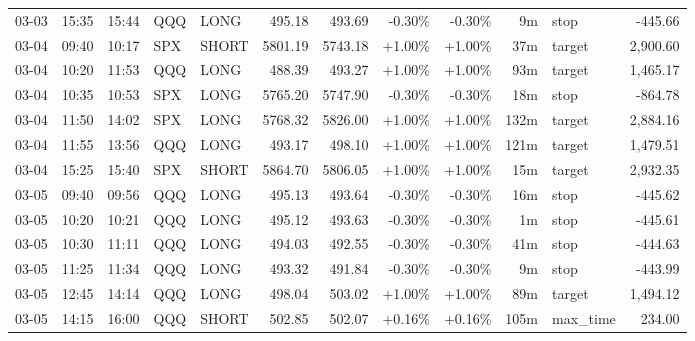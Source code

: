 \documentclass[11pt,a4paper]{article}
\begin{document}
\begin{center}
\begin{longtable}{>{\color{txtmain}}l l l l l r r r r r >{\color{txtmain}}l r}
03-03 & 15:35 & 15:44 & QQQ & LONG & 495.18 & 493.69 & \textcolor{lossred}{-0.30\%} & \textcolor{lossred}{-0.30\%} & 9m & stop & \textcolor{lossred}{-445.66} \\
03-04 & 09:40 & 10:17 & SPX & SHORT & 5801.19 & 5743.18 & \textcolor{wingreen}{+1.00\%} & \textcolor{wingreen}{+1.00\%} & 37m & target & \textcolor{wingreen}{2,900.60} \\
03-04 & 10:20 & 11:53 & QQQ & LONG & 488.39 & 493.27 & \textcolor{wingreen}{+1.00\%} & \textcolor{wingreen}{+1.00\%} & 93m & target & \textcolor{wingreen}{1,465.17} \\
03-04 & 10:35 & 10:53 & SPX & LONG & 5765.20 & 5747.90 & \textcolor{lossred}{-0.30\%} & \textcolor{lossred}{-0.30\%} & 18m & stop & \textcolor{lossred}{-864.78} \\
03-04 & 11:50 & 14:02 & SPX & LONG & 5768.32 & 5826.00 & \textcolor{wingreen}{+1.00\%} & \textcolor{wingreen}{+1.00\%} & 132m & target & \textcolor{wingreen}{2,884.16} \\
03-04 & 11:55 & 13:56 & QQQ & LONG & 493.17 & 498.10 & \textcolor{wingreen}{+1.00\%} & \textcolor{wingreen}{+1.00\%} & 121m & target & \textcolor{wingreen}{1,479.51} \\
03-04 & 15:25 & 15:40 & SPX & SHORT & 5864.70 & 5806.05 & \textcolor{wingreen}{+1.00\%} & \textcolor{wingreen}{+1.00\%} & 15m & target & \textcolor{wingreen}{2,932.35} \\
03-05 & 09:40 & 09:56 & QQQ & LONG & 495.13 & 493.64 & \textcolor{lossred}{-0.30\%} & \textcolor{lossred}{-0.30\%} & 16m & stop & \textcolor{lossred}{-445.62} \\
03-05 & 10:20 & 10:21 & QQQ & LONG & 495.12 & 493.63 & \textcolor{lossred}{-0.30\%} & \textcolor{lossred}{-0.30\%} & 1m & stop & \textcolor{lossred}{-445.61} \\
03-05 & 10:30 & 11:11 & QQQ & LONG & 494.03 & 492.55 & \textcolor{lossred}{-0.30\%} & \textcolor{lossred}{-0.30\%} & 41m & stop & \textcolor{lossred}{-444.63} \\
03-05 & 11:25 & 11:34 & QQQ & LONG & 493.32 & 491.84 & \textcolor{lossred}{-0.30\%} & \textcolor{lossred}{-0.30\%} & 9m & stop & \textcolor{lossred}{-443.99} \\
03-05 & 12:45 & 14:14 & QQQ & LONG & 498.04 & 503.02 & \textcolor{wingreen}{+1.00\%} & \textcolor{wingreen}{+1.00\%} & 89m & target & \textcolor{wingreen}{1,494.12} \\
03-05 & 14:15 & 16:00 & QQQ & SHORT & 502.85 & 502.07 & \textcolor{wingreen}{+0.16\%} & \textcolor{wingreen}{+0.16\%} & 105m & max\_time & \textcolor{wingreen}{234.00} \\

\end{longtable}
\end{center}
\end{document}
